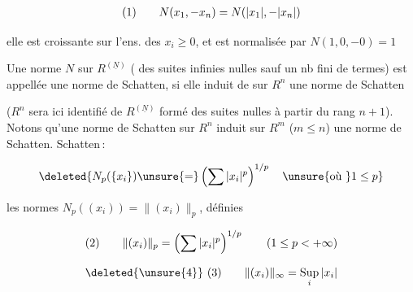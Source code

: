 
\[
\begin{array}{@{}l@{\qquad}l@{}}
(1)&\displaystyle N(x_1,\mathord{-}x_n)=N(|x_1|,\mathord{-}|x_n|)
\end{array}
\]

  elle est croissante  sur l'ens. des $x_i\geq 0$, et  est normalisée par $N(1,0,\mathord{-}0)=1$

Une norme $N$ sur $R^{(\underline N)}$  ( des suites infinies  nulles sauf un nb fini de termes) est appellée une norme de Schatten, si  elle induit  de sur $R^n$ une norme de Schatten

($R^n$ sera ici identifié  de $R^{(\underline N)}$ formé des suites nulles à partir du rang $n+1$). Notons qu'une norme de Schatten sur $R^n$ induit sur $R^m$ ($m\leq n$) une norme de Schatten.  Schatten\,:


\[
\deleted{N_p(\{x_i\})\unsure{=}\left(\sum |x_i|^p\right)^{1/p}\quad\text{\unsure{où }}1\leq p}
\]

les normes $N_p((x_i))=\lVert(x_i)\rVert_p$, définies  

{\reversemarginpar{}}
\[
\begin{array}{@{}l@{\qquad}l@{}}
(2)&\displaystyle \lVert(x_i)\rVert_p=\left(\sum |x_i|^p\right)^{1/p}\qquad (1\leq p<+\infty)
\end{array}
\]

\[
\begin{array}{@{}l@{\qquad}l@{}}
\deleted{\unsure{4}}\ (3)&\displaystyle \lVert(x_i)\rVert_\infty=\underset{i}{\operatorname{Sup}}\,|x_i|
\end{array}
\]


